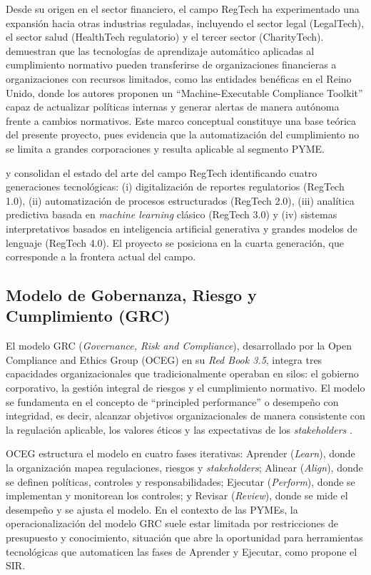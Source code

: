 \documentclass[12pt,a4paper,oneside]{report}
\begin{document}
Desde su origen en el sector financiero, el campo RegTech ha experimentado una expansión hacia otras industrias reguladas, incluyendo el sector legal (LegalTech), el sector salud (HealthTech regulatorio) y el tercer sector (CharityTech). \textcite{singh2022} demuestran que las tecnologías de aprendizaje automático aplicadas al cumplimiento normativo pueden transferirse de organizaciones financieras a organizaciones con recursos limitados, como las entidades benéficas en el Reino Unido, donde los autores proponen un \enquote{Machine-Executable Compliance Toolkit} capaz de actualizar políticas internas y generar alertas de manera autónoma frente a cambios normativos. Este marco conceptual constituye una base teórica del presente proyecto, pues evidencia que la automatización del cumplimiento no se limita a grandes corporaciones y resulta aplicable al segmento PYME.

\textcite{charoenwong2024} y \textcite{liu2022} consolidan el estado del arte del campo RegTech identificando cuatro generaciones tecnológicas: (i) digitalización de reportes regulatorios (RegTech 1.0), (ii) automatización de procesos estructurados (RegTech 2.0), (iii) analítica predictiva basada en \textit{machine learning} clásico (RegTech 3.0) y (iv) sistemas interpretativos basados en inteligencia artificial generativa y grandes modelos de lenguaje (RegTech 4.0). El proyecto se posiciona en la cuarta generación, que corresponde a la frontera actual del campo.

\subsection{Modelo de Gobernanza, Riesgo y Cumplimiento (GRC)}\label{subsec:modelo-grc}

El modelo GRC (\textit{Governance, Risk and Compliance}), desarrollado por la Open Compliance and Ethics Group (OCEG) en su \textit{Red Book 3.5}, integra tres capacidades organizacionales que tradicionalmente operaban en silos: el gobierno corporativo, la gestión integral de riesgos y el cumplimiento normativo. El modelo se fundamenta en el concepto de \enquote{principled performance} o desempeño con integridad, es decir, alcanzar objetivos organizacionales de manera consistente con la regulación aplicable, los valores éticos y las expectativas de los \textit{stakeholders} \parencite{oceg2023}.

OCEG estructura el modelo en cuatro fases iterativas: Aprender (\textit{Learn}), donde la organización mapea regulaciones, riesgos y \textit{stakeholders}; Alinear (\textit{Align}), donde se definen políticas, controles y responsabilidades; Ejecutar (\textit{Perform}), donde se implementan y monitorean los controles; y Revisar (\textit{Review}), donde se mide el desempeño y se ajusta el modelo. En el contexto de las PYMEs, la operacionalización del modelo GRC suele estar limitada por restricciones de presupuesto y conocimiento, situación que abre la oportunidad para herramientas tecnológicas que automaticen las fases de Aprender y Ejecutar, como propone el SIR.
\end{document}
